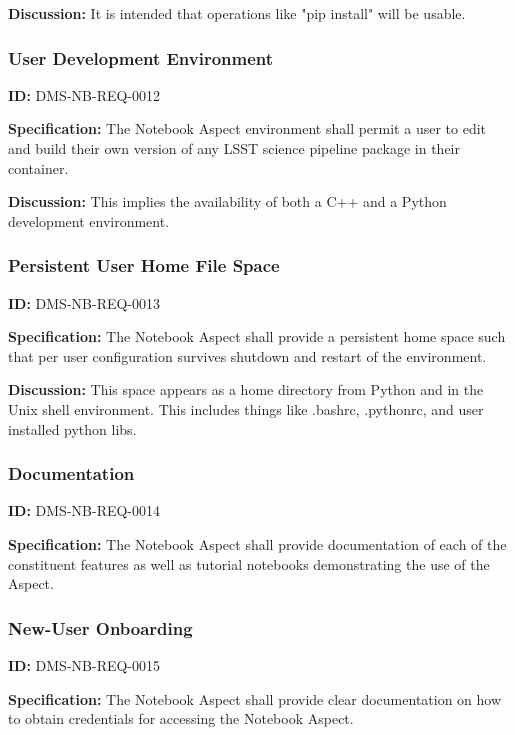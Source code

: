 \documentclass[SE,toc,lsstdraft]{lsstdoc}
\begin{document}
\textbf{Discussion:}
It is intended that operations like "pip install" will be usable.

\subsubsection{User Development Environment}

\label{DMS-NB-REQ-0012}
\textbf{ID:} DMS-NB-REQ-0012

\textbf{Specification:}
The Notebook Aspect environment shall permit a user to edit and build their own version of any LSST science pipeline package in their container.

\textbf{Discussion:}
This implies the availability of both a C++ and a Python development environment.

\subsubsection{Persistent User Home File Space}

\label{DMS-NB-REQ-0013}
\textbf{ID:} DMS-NB-REQ-0013

\textbf{Specification:}
The Notebook Aspect shall provide a persistent home space such that per user configuration survives shutdown and restart of the environment.

\textbf{Discussion:}
This space appears as a home directory from Python and in the Unix shell environment. This includes things like .bashrc, .pythonrc, and user installed python libs.

\subsubsection{Documentation}

\label{DMS-NB-REQ-0014}
\textbf{ID:} DMS-NB-REQ-0014

\textbf{Specification:}
The Notebook Aspect shall provide documentation of each of the constituent features as well as tutorial notebooks demonstrating the use of the Aspect.

\subsubsection{New-User Onboarding}

\label{DMS-NB-REQ-0015}
\textbf{ID:} DMS-NB-REQ-0015

\textbf{Specification:}
The Notebook Aspect shall provide clear documentation on how to obtain credentials for accessing the Notebook Aspect.
\end{document}
